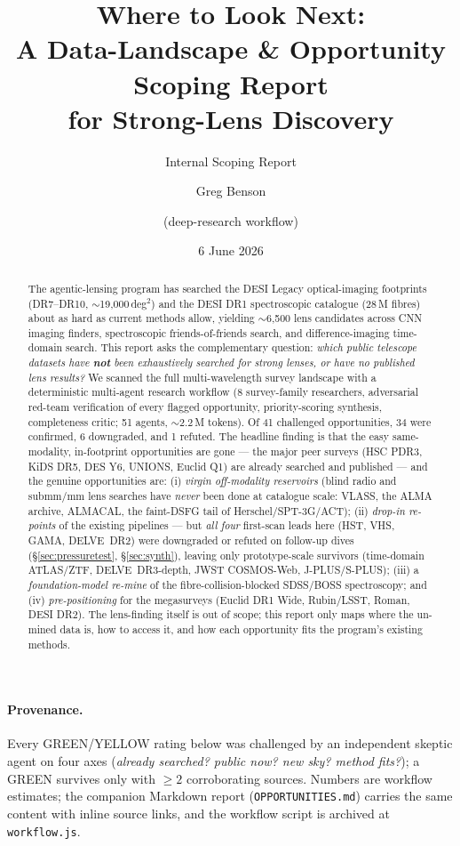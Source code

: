 \documentclass[11pt,letterpaper]{article}
\title{Where to Look Next:\\
       A Data-Landscape \& Opportunity Scoping Report\\
       for Strong-Lens Discovery}
\author{Greg Benson \and (deep-research workflow)}
\date{6 June 2026}
\begin{document}
\maketitle
\subtitle{Internal Scoping Report}

\begin{abstract}
The agentic-lensing program has searched the {DESI} Legacy optical-imaging footprints
(DR7--DR10, $\sim$19{,}000\,deg$^2$) and the {DESI} {DR1} spectroscopic catalogue (28\,M fibres)
about as hard as current methods allow, yielding $\sim$6{,}500 lens candidates across CNN
imaging finders, spectroscopic friends-of-friends search, and difference-imaging time-domain
search. This report asks the complementary question: \emph{which public telescope datasets have
\textbf{not} been exhaustively searched for strong lenses, or have no published lens results?}
We scanned the full multi-wavelength survey landscape with a deterministic multi-agent
research workflow (8 survey-family researchers, adversarial red-team verification of every
flagged opportunity, priority-scoring synthesis, completeness critic; 51 agents, $\sim$2.2\,M
tokens). Of 41 challenged opportunities, 34 were confirmed, 6 downgraded, and 1 refuted. The
headline finding is that the easy same-modality, in-footprint opportunities are gone --- the
major peer surveys (HSC PDR3, KiDS DR5, DES Y6, UNIONS, Euclid Q1) are already searched and
published --- and the genuine opportunities are: (i) \emph{virgin off-modality reservoirs}
(blind radio and submm/mm lens searches have \emph{never} been done at catalogue scale: VLASS,
the ALMA archive, ALMACAL, the faint-DSFG tail of Herschel/SPT-3G/ACT); (ii) \emph{drop-in
re-points} of the existing pipelines --- but \emph{all four} first-scan leads here (HST, VHS, GAMA,
DELVE~DR2) were downgraded or refuted on follow-up dives (\S\ref{sec:pressuretest},
\S\ref{sec:synth}), leaving only prototype-scale survivors (time-domain ATLAS/ZTF, DELVE~DR3-depth,
JWST COSMOS-Web, J-PLUS/S-PLUS); (iii) a
\emph{foundation-model re-mine} of the fibre-collision-blocked SDSS/BOSS spectroscopy; and
(iv) \emph{pre-positioning} for the megasurveys (Euclid DR1 Wide, Rubin/LSST, Roman,
DESI DR2). The lens-finding itself is out of scope; this report only maps where the un-mined
data is, how to access it, and how each opportunity fits the program's existing methods.
\end{abstract}

\paragraph{Provenance.} Every GREEN/YELLOW rating below was challenged by an independent
skeptic agent on four axes (\emph{already searched? public now? new sky? method fits?}); a GREEN
survives only with $\ge 2$ corroborating sources. Numbers are workflow estimates; the companion
Markdown report (\texttt{OPPORTUNITIES.md}) carries the same content with inline source links,
and the workflow script is archived at \texttt{workflow.js}.
\end{document}

